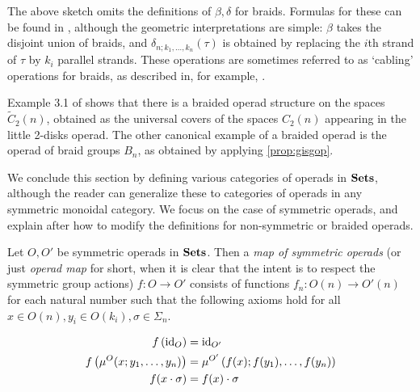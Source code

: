 \begin{rem}\label{rem:br-op-needed}
The above sketch omits the definitions of $\beta, \delta$ for braids. 
Formulas for these can be found in \cite[Examples~5.1.11,~5.1.13]{yau_infinity_2021}, although the geometric interpretations are simple: $\beta$ takes the disjoint union of braids, and $\delta_{n; k_1, \ldots, k_n}(\tau)$ is obtained by replacing the $i$th strand of $\tau$ by $k_i$ parallel strands.
These operations are sometimes referred to as `cabling' operations for braids, as described in, for example, \cite{doucot_local_2025}.
\end{rem}

\begin{example}\label{ex:braided-op}
Example 3.1 of \cite{fie-br} shows that there is a braided operad structure on the spaces $\tilde{C}_2(n)$, obtained as the universal covers of the spaces $C_2(n)$ appearing in the little 2-disks operad. The other canonical example of a braided operad is the operad of braid groups $B_n$, as obtained by applying \cref{prop:gisgop}.
\end{example}


We conclude this section by defining various categories of operads in $\mathbf{Sets}$, although the reader can generalize these to categories of operads in any symmetric monoidal category. We focus on the case of symmetric operads, and explain after how to modify the definitions for non-symmetric or braided operads.

\begin{Defi}\label{Defi:sym_op_map}
Let $O, O'$ be symmetric operads in $\mathbf{Sets}$. Then a \textit{map of symmetric operads} (or just \emph{operad map} for short, when it is clear that the intent is to respect the symmetric group actions) $f \colon O \rightarrow O'$ consists of functions $f_{n} \colon O(n) \rightarrow O'(n)$ for each natural number such that the following axioms hold for all $x \in O(n), y_i \in O(k_i), \sigma \in \Sigma_n$.

  \begin{align*}
    f\left(\textrm{id}_O\right) &= \textrm{id}_{O'}\\
    f\left(\mu^{O}(x;y_1,\ldots,y_n)\right) &= \mu^{O'}\left(f(x);f(y_1),\ldots,f(y_n)\right)\\
    f(x \cdot \sigma) & = f(x) \cdot \sigma
  \end{align*}
\end{Defi}

